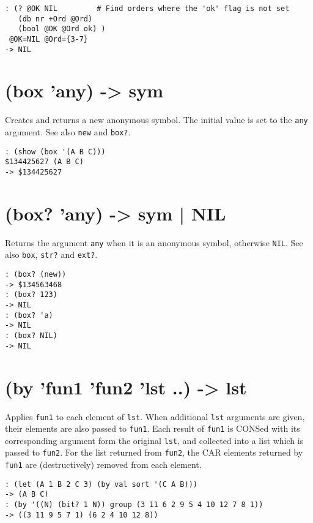 {\begin{verbatim}
: (? @OK NIL         # Find orders where the 'ok' flag is not set
   (db nr +Ord @Ord)
   (bool @OK @Ord ok) )
 @OK=NIL @Ord={3-7}
-> NIL
\end{verbatim}

 
\section{(box 'any) -> sym}
\label{sec-8-1-2-17}


Creates and returns a new anonymous symbol. The initial value is set to
the \texttt{any} argument. See also \texttt{new} and \texttt{box?}.


\begin{verbatim}
: (show (box '(A B C)))
$134425627 (A B C)
-> $134425627
\end{verbatim}

 
\section{(box? 'any) -> sym | NIL}
\label{sec-8-1-2-18}


Returns the argument \texttt{any} when it is an anonymous symbol, otherwise
\texttt{NIL}. See also \texttt{box}, \texttt{str?} and \texttt{ext?}.


\begin{verbatim}
: (box? (new))
-> $134563468
: (box? 123)
-> NIL
: (box? 'a)
-> NIL
: (box? NIL)
-> NIL
\end{verbatim}

 
\section{(by 'fun1 'fun2 'lst ..) -> lst}
\label{sec-8-1-2-19}


Applies \texttt{fun1} to each element of \texttt{lst}. When additional \texttt{lst} arguments
are given, their elements are also passed to \texttt{fun1}. Each result of
\texttt{fun1} is CONSed with its corresponding argument form the original
\texttt{lst}, and collected into a list which is passed to \texttt{fun2}. For the list
returned from \texttt{fun2}, the CAR elements returned by \texttt{fun1} are
(destructively) removed from each element.


\begin{verbatim}
: (let (A 1 B 2 C 3) (by val sort '(C A B)))
-> (A B C)
: (by '((N) (bit? 1 N)) group (3 11 6 2 9 5 4 10 12 7 8 1))
-> ((3 11 9 5 7 1) (6 2 4 10 12 8))
\end{verbatim}

}
